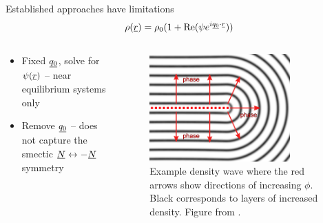 \documentclass[10pt,mathserif]{beamer}
\newcommand{\suf}[2]{\stackunder[0.5pt]{\stackunder[1pt]{\ensuremath{#1}}{\rule{\widthof{\ensuremath{#2}}*\real{0.9}}{.1ex}}}{}}
\newcommand{\su}[1]{\suf{#1}{#1}}
\newcommand{\ssu}[1]{\scriptsize\su{#1}\normalsize}
\newcommand{\NN}{\ensuremath{\su{N}}}
\begin{document}
\begin{frame}[fragile]{Established approaches have limitations}
    \newrefsection
    \vspace{-\fill}
    \begin{equation*}
        \rho(\su{r}) = \rho_0 (1 + \Re(\psi e^{i\ssu{q_0} \cdot \ssu{r}}))
    \end{equation*}
    \vspace{\fill}

    \begin{columns}
        \begin{column}{0.49\textwidth}
            \begin{itemize}
                \item Fixed $\su{q_0}$, solve for $\psi(\su{r})$ -- near equilibrium systems only
                \item Remove $\su{q_0}$ -- does not capture the smectic $\NN\leftrightarrow-\NN$ symmetry\cite{pevnyiModelingSmecticLayers2014}
            \end{itemize}
        \end{column}
        \begin{column}{0.60\textwidth}
            \begin{figure}
                \includegraphics[width=0.8\textwidth]{figures/pevnyi.pdf}
                \caption{
                    Example density wave where the red arrows show directions of increasing $\phi$.
                    Black corresponds to layers of increased density.
                    Figure from \cite{pevnyiModelingSmecticLayers2014}.
                }
            \end{figure}
        \end{column}
    \end{columns}
    \vspace{\fill}
    \printbibliography[heading=none]
    \vspace{-\fill}
\end{frame}
\end{document}
